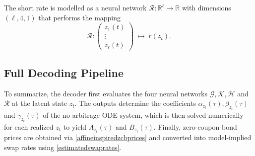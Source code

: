 \begin{description}[
    style=unboxed,
    leftmargin=0pt,
    labelindent=0pt,
    labelsep=0.5em
]




\item[Short-rate network.]

The short rate is modelled as a neural network $\mathcal{R}:\mathbb{R}^\ell \to \mathbb{R}$ with dimensions $(\ell,4,1)$ that performs the mapping
\[
\mathcal{R} :
\begin{pmatrix}
z_1(t) \\
\vdots \\
z_\ell(t)
\end{pmatrix}
\;\mapsto\;
\tilde{r}(z_t).
\]

\end{description}

\subsection{Full Decoding Pipeline}
\label{subsec:fulldecodingpipeline}

To summarize, the decoder first evaluates the four neural networks $\mathcal{G},\mathcal{K},\mathcal{H}$ and $\mathcal{R}$ at the latent state $z_t$. The outputs determine the coefficients $\alpha_{z_t}(\tau),\beta_{z_t}(\tau)$ and $\gamma_{z_t}(\tau)$ of the no-arbitrage ODE system, which is then solved numerically for each realized $z_t$ to yield $A_{z_t}(\tau)$ and $B_{z_t}(\tau)$. Finally, zero-coupon bond prices are obtained via \eqref{affineinspiredzcbprices} and converted into model-implied swap rates using \eqref{estimatedswaprates}.


